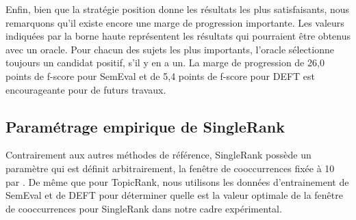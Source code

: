     Enfin, bien que la stratégie \og{}position\fg{} donne les résultats les plus
    satisfaisants, nous remarquons qu'il existe encore une marge de progression
    importante. Les valeurs indiquées par la borne haute représentent les
    résultats qui pourraient être obtenus avec un oracle. Pour chacun des sujets
    les plus importants, l'oracle sélectionne toujours un candidat positif, s'il
    y en a un. La marge de progression de 26,0 points de f-score pour SemEval et
    de 5,4 points de f-score pour DEFT est encourageante pour de futurs travaux.

  \subsection{Paramétrage empirique de SingleRank}
  \label{subsec:parametrage_empirique_de_singlerank}
    Contrairement aux autres méthodes de référence, SingleRank possède un
    paramètre qui est définit arbitrairement, la fenêtre de cooccurrences fixée
    à 10 par . De
    même que pour TopicRank, nous utilisons les données d'entrainement de
    SemEval et de DEFT pour déterminer quelle est la valeur optimale de la
    fenêtre de cooccurrences pour SingleRank dans notre cadre expérimental.
